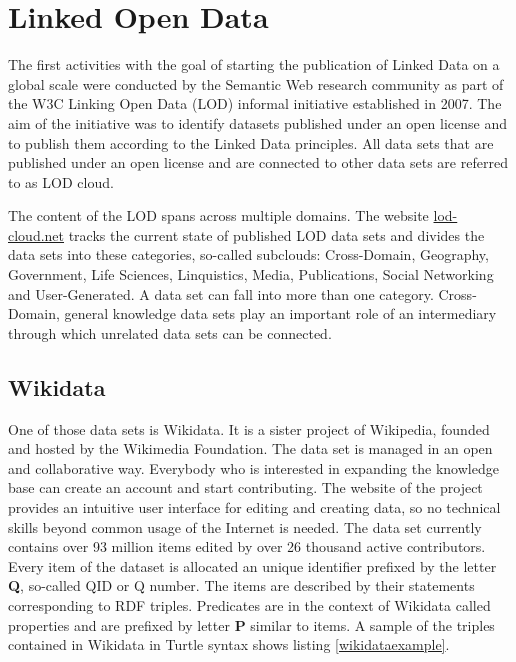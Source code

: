 
\section{Linked Open Data}

The first activities with the goal of starting the publication of Linked Data on a global scale were conducted by the Semantic Web research community as part of the W3C Linking Open Data (LOD) informal initiative established in 2007.\cite{Heath2011} The aim of the initiative was to identify datasets published under an open license and to publish them according to the Linked Data principles. All data sets that are published under an open license and are connected to other data sets are referred to as LOD cloud. 

The content of the LOD spans across multiple domains. The website \href{http://lod-cloud.net}{lod-cloud.net} tracks the current state of published LOD data sets and divides the data sets into these categories, so-called subclouds: Cross-Domain, Geography, Government, Life Sciences, Linquistics, Media, Publications, Social Networking and User-Generated. A data set can fall into more than one category. Cross-Domain, general knowledge data sets play an important role of an intermediary through which unrelated data sets can be connected. 

\subsection{Wikidata}

One of those data sets is Wikidata. It is a sister project of Wikipedia, founded and hosted by the Wikimedia Foundation. The data set is managed in an open and collaborative way. Everybody who is interested in expanding the knowledge base can create an account and start contributing. The website of the project provides an intuitive user interface for editing and creating data, so no technical skills beyond common usage of the Internet is needed. The data set currently contains over 93 million items edited by over 26 thousand active contributors. Every item of the dataset is allocated an unique identifier prefixed by the letter \textbf{Q}, so-called QID or Q number. The items are described by their statements corresponding to RDF triples. Predicates are in the context of Wikidata called properties and are prefixed by letter \textbf{P} similar to items. A sample of the triples contained in Wikidata in Turtle syntax shows listing \ref{wikidataexample}.

